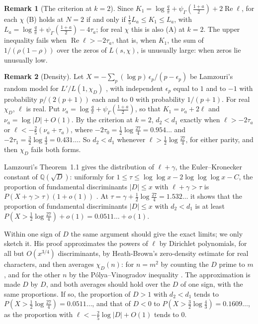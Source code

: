 \documentclass[11pt]{article}
\theoremstyle{definition}
\newtheorem*{remark}{Remark}
\begin{document}
\begin{remark}[The criterion at $k = 2$]
Since $K_1 = \log\frac q\pi + \psi_\Gamma(\frac{1 + a}2) + 2\operatorname{Re}\ell$, for each $\chi$ (B) holds at $N =
2$ if and only if $\frac15 L_a \le K_1 \le L_a$, with $L_a = \log \frac q\pi + \psi_\Gamma(\frac{1 + a}{2}) -
4\tau_a$; for real $\chi$ this is also (A) at $k = 2$. The upper inequality fails when $\operatorname{Re}\ell >
-2\tau_a$, that is, when $K_1$, the sum of $1/(\rho(1 - \rho))$ over the zeros of $L(s, \chi)$, is unusually large:
when zeros lie unusually low.
\end{remark}

\begin{remark}[Density]
Let $X = -\sum_p (\log p)\,\epsilon_p/(p - \epsilon_p)$ be Lamzouri's random model for $L'/L(1, \chi_D)$
\cite{lamzouri}, with independent $\epsilon_p$ equal to $1$ and to $-1$ with probability $p/(2(p + 1))$ each and to $0$
with probability $1/(p + 1)$. For real $\chi_D$, $\ell$ is real. Put $\nu_a = \log\frac q\pi + \psi_\Gamma(\frac{1 +
a}2)$, so that $K_1 = \nu_a + 2\ell$ and $\nu_a = \log|D| + O(1)$. By the criterion at $k = 2$, $d_2 < d_1$
exactly when $\ell > -2\tau_a$ or $\ell < -\frac25(\nu_a + \tau_a)$, where $-2\tau_0 = \frac12\log\frac{27}4 =
0.954\ldots$ and $-2\tau_1 = \frac32\log\frac43 = 0.431\ldots$. So $d_2 < d_1$ whenever $\ell > \frac12\log\frac{27}4$,
for either parity, and then $\chi_D$ fails both forms.

Lamzouri's Theorem~1.1 gives the distribution of $\ell + \gamma$, the Euler--Kronecker constant of $\mathbb
Q(\sqrt D)$: uniformly for $1 \le \tau \le \log\log x - 2\log\log\log x - C$, the proportion of fundamental
discriminants $|D| \le x$ with $\ell + \gamma > \tau$ is $P(X + \gamma > \tau)(1 + o(1))$
\cite[Theorem~1.1]{lamzouri}. At $\tau = \gamma + \frac12\log\frac{27}4 = 1.532\ldots$ it shows that the proportion
of fundamental discriminants $|D| \le x$ with $d_2 < d_1$ is at least $P(X > \frac12\log\frac{27}4) + o(1) =
0.0511\ldots + o(1)$.

Within one sign of $D$ the same argument should give the exact limits; we only sketch it. His proof approximates the
powers of $\ell$ by Dirichlet polynomials, for all but $O(x^{3/4})$ discriminants, by Heath-Brown's zero-density
estimate for real characters, and then averages $\chi_D(n)$: for $n = m^2$ by counting the $D$ prime to $m$, and for
the other $n$ by the P\'olya--Vinogradov inequality \cite[Section~2]{lamzouri}. The approximation is made $D$ by $D$,
and both averages should hold over the $D$ of one sign, with the same proportions. If so, the proportion of $D > 1$
with $d_2 < d_1$ tends to $P(X > \frac12\log\frac{27}{4}) = 0.0511\ldots$, and that of $D < 0$ to $P(X >
\frac32\log\frac43) = 0.1609\ldots$, as the proportion with $\ell < -\frac25\log|D| + O(1)$ tends to $0$.
\end{remark}
\end{document}
